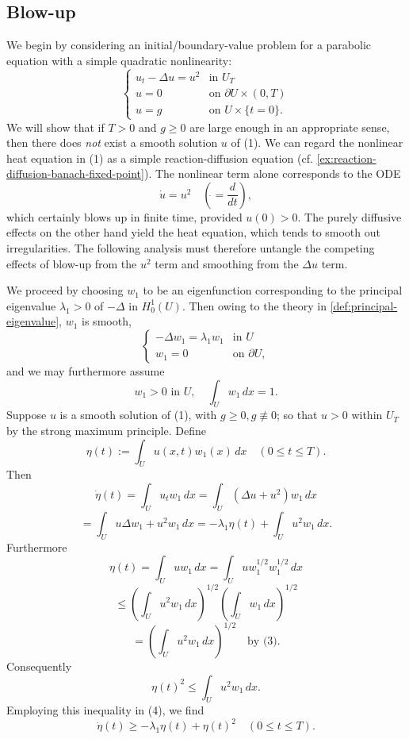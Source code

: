 \subsection{Blow-up}
\label{sec:blow-up}

We begin by considering an initial/boundary-value problem for a parabolic equation with a simple quadratic nonlinearity:
\[
\begin{cases}
u_t - \Delta u = u^2 & \text{in } U_T \\
u = 0 & \text{on } \partial U \times (0,T) \\
u = g & \text{on } U \times \{t = 0\}.
\end{cases}
\tag{1}
\]
We will show that if $T > 0$ and $g \geq 0$ are large enough in an appropriate sense, then there does \textit{not} exist a smooth solution $u$ of (1). We can regard the nonlinear heat equation in (1) as a simple reaction-diffusion equation (cf. \cref{ex:reaction-diffusion-banach-fixed-point}). The nonlinear term alone corresponds to the ODE
\[
\dot{u} = u^2 \quad \left(\dot{} = \frac{d}{dt}\right),
\tag{2}
\]
which certainly blows up in finite time, provided $u(0) > 0$. The purely diffusive effects on the other hand yield the heat equation, which tends to smooth out irregularities. The following analysis must therefore untangle the competing effects of blow-up from the $u^2$ term and smoothing from the $\Delta u$ term.

We proceed by choosing $w_1$ to be an eigenfunction corresponding to the principal eigenvalue $\lambda_1 > 0$ of $-\Delta$ in $H_0^1(U)$. Then owing to the theory in \cref{def:principal-eigenvalue}, $w_1$ is smooth,
\[
\begin{cases}
-\Delta w_1 = \lambda_1 w_1 & \text{in } U \\
w_1 = 0 & \text{on } \partial U,
\end{cases}
\]
and we may furthermore assume
\[
w_1 > 0 \text{ in } U, \quad \int_U w_1 \, dx = 1.
\tag{3}
\]
Suppose $u$ is a smooth solution of (1), with $g \geq 0, g \not\equiv 0$; so that $u > 0$ within $U_T$ by the strong maximum principle. Define
\[
\eta(t) := \int_U u(x,t)w_1(x) \, dx \quad (0 \le t \le T).
\]
Then
\[
\dot{\eta}(t) = \int_U u_t w_1 \, dx = \int_U (\Delta u + u^2)w_1 \, dx
\]
\[
= \int_U u\Delta w_1 + u^2 w_1 \, dx = -\lambda_1 \eta(t) + \int_U u^2 w_1 \, dx.
\tag{4}
\]
Furthermore
\[
\eta(t) = \int_U u w_1 \, dx = \int_U u w_1^{1/2}w_1^{1/2}\, dx
\]
\[
\leq \left(\int_U u^2 w_1\, dx\right)^{1/2}\left(\int_U w_1\, dx\right)^{1/2}
\]
\[
= \left(\int_U u^2 w_1\, dx\right)^{1/2} \quad \text{by (3)}.
\tag{5}
\]
Consequently
\[
\eta(t)^2 \le \int_U u^2 w_1 \, dx.
\]
Employing this inequality in (4), we find
\[
\dot{\eta}(t) \ge -\lambda_1\eta(t) + \eta(t)^2 \quad (0 \le t \le T).
\tag{6}
\]

